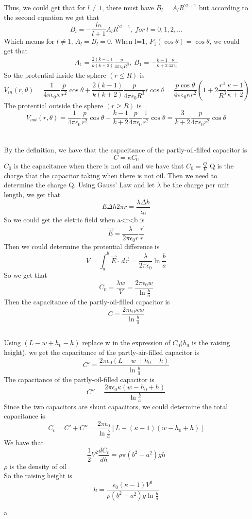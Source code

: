 \documentclass[10.5pt]{article}
\begin{document}
Thus, we could get that for $l\neq 1$, there must have $B_l=A_lR^{2l+1}$ but according to the second equation we get that $$B_l=-\frac{l\kappa}{l+1}A_lR^{2l+1},~for ~l=0,1,2,\dots$$ \indent
Which means for $l\neq 1$, $A_l=B_l=0$. When l=1, $P_1(\cos\theta)=\cos\theta$, we could get that $$\begin{aligned}
    A_1=\frac{2(k-1)}{k(k+2)}\frac{p}{4\pi\epsilon_0R^3},~
    B_1=-\frac{k-1}{k+2}\frac{p}{4\pi\epsilon_0}
\end{aligned}$$\indent
So the protential inside the sphere $(r\leqslant R)$ is $$V_{in}(r,\theta)=\frac{1}{4\pi\epsilon_0\kappa}\frac{p}{r^2}\cos\theta + \frac{2(k-1)}{k(k+2)}\frac{p}{4\pi\epsilon_0R^3}r\cos\theta=\frac{p\cos\theta}{4\pi\epsilon_0\kappa r^2}\left(1+2\frac{r^3}{R^3}\frac{\kappa-1}{\kappa+2}\right)$$\indent
The protential outside the sphere $(r\geqslant R)$ is $$V_{out}(r,\theta)=\frac{1}{4\pi\epsilon_0}\frac{p}{r^2}\cos\theta - \frac{k-1}{k+2}\frac{p}{4\pi\epsilon_0}\frac{1}{r^2}\cos\theta=\frac{3}{k+2}\frac{p}{4\pi\epsilon_0 r^2}\cos\theta$$

\section{}
\subsection{}
By the definition, we have that the capacitance of the partly-oil-filled capacitor is $$C=\kappa C_0$$\indent
$C_0$ is the capacitance when there is not oil and we have that $C_0=\frac{Q}{V}$ Q is the charge that the capacitor taking when there is not oil. Then we need to determine the charge Q. Using Gauss' Law and let $\lambda$ be the charge per unit length, we get that $$E\Delta h 2\pi r=\frac{\lambda \Delta h}{\epsilon_0}$$\indent
So we could get the eletric field when a<r<b is $$\vec{E}=\frac{\lambda}{2\pi\epsilon_0r}\frac{\vec{r}}{r}$$\indent
Then we could determine the protential difference is $$V=\int_a^b \vec{E}\cdot\,d\vec{r}=\frac{\lambda}{2\pi\epsilon_0}\ln\frac{b}{a}$$\indent
So we get that $$C_0=\frac{\lambda w}{V}=\frac{2\pi\epsilon_0 w}{\ln\frac{b}{a}}$$\indent
Then the capacitance of the partly-oil-filled capacitor is $$C=\frac{2\pi\epsilon_0\kappa w}{\ln\frac{b}{a}}$$\indent
\subsection{}
Using $(L-w+h_0-h)$ replace w in the expression of $C_0$($h_0$ is the raising height), we get the capacitance of the partly-air-filled capacitor is $$C'=\frac{2\pi\epsilon_0 (L-w+h_0-h)}{\ln\frac{b}{a}}$$\indent
The capacitance of the partly-oil-filled capacitor is $$C''=\frac{2\pi\epsilon_0\kappa (w-h_0+h)}{\ln\frac{b}{a}}$$\indent
Since the two capacitors are shunt capacitors, we could determine the total capacitance is $$C_t=C'+C''=\frac{2\pi\epsilon_0}{\ln\frac{b}{a}}\left[L+(\kappa-1)(w-h_0+h)\right]$$\indent
We have that $$\frac{1}{2}V^2\frac{d C_t}{dh}=\rho\pi(b^2-a^2)gh$$$\rho$ is the density of oil \\\indent
So the raising height is $$h=\frac{\epsilon_0(\kappa-1)V^2}{\rho(b^2-a^2)g\ln\frac{b}{a}}$$

\newpage
a
\end{document}
